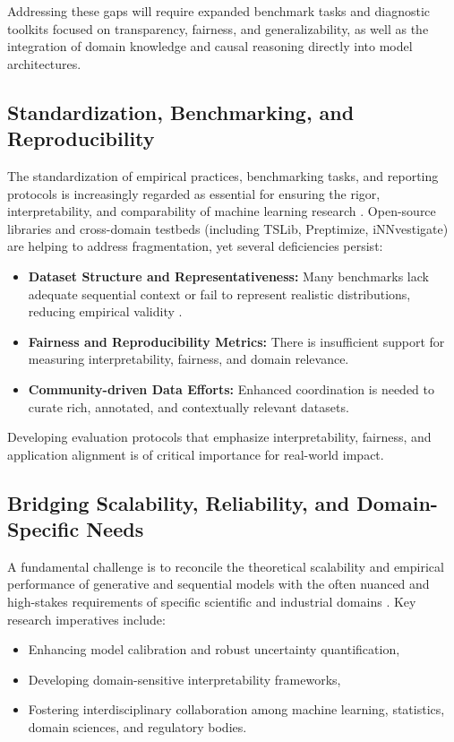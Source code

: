 \documentclass[sigconf]{acmart}
\begin{document}
Addressing these gaps will require expanded benchmark tasks and diagnostic toolkits focused on transparency, fairness, and generalizability, as well as the integration of domain knowledge and causal reasoning directly into model architectures.

\subsection{Standardization, Benchmarking, and Reproducibility}
\label{subsec:standardization}

The standardization of empirical practices, benchmarking tasks, and reporting protocols is increasingly regarded as essential for ensuring the rigor, interpretability, and comparability of machine learning research \cite{ref85,ref86,ref87}. Open-source libraries and cross-domain testbeds (including TSLib, Preptimize, iNNvestigate) are helping to address fragmentation, yet several deficiencies persist:

\begin{itemize}
    \item \textbf{Dataset Structure and Representativeness:} Many benchmarks lack adequate sequential context or fail to represent realistic distributions, reducing empirical validity \cite{ref87}.
    \item \textbf{Fairness and Reproducibility Metrics:} There is insufficient support for measuring interpretability, fairness, and domain relevance.
    \item \textbf{Community-driven Data Efforts:} Enhanced coordination is needed to curate rich, annotated, and contextually relevant datasets.
\end{itemize}

Developing evaluation protocols that emphasize interpretability, fairness, and application alignment is of critical importance for real-world impact.

\subsection{Bridging Scalability, Reliability, and Domain-Specific Needs}

A fundamental challenge is to reconcile the theoretical scalability and empirical performance of generative and sequential models with the often nuanced and high-stakes requirements of specific scientific and industrial domains \cite{ref82,ref84,ref86,ref87}. Key research imperatives include:

\begin{itemize}
    \item Enhancing model calibration and robust uncertainty quantification,
    \item Developing domain-sensitive interpretability frameworks,
    \item Fostering interdisciplinary collaboration among machine learning, statistics, domain sciences, and regulatory bodies.
\end{itemize}
\end{document}

